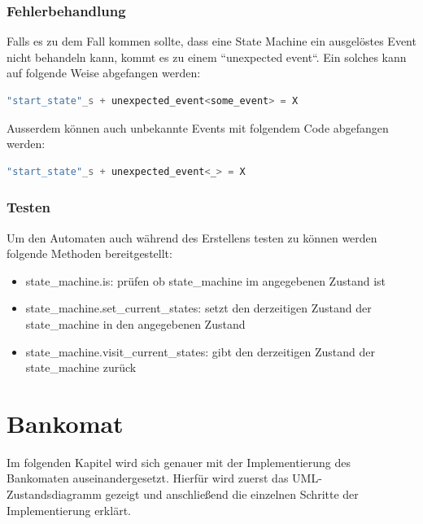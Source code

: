 \documentclass{report}
\begin{document}
\subsection{Fehlerbehandlung}
Falls es zu dem Fall kommen sollte, dass eine State Machine ein ausgelöstes Event nicht behandeln kann, kommt es zu einem ``unexpected event``. Ein solches kann auf folgende Weise abgefangen werden: 
\begin{lstlisting}[language=C++]
"start_state"_s + unexpected_event<some_event> = X
\end{lstlisting}
Ausserdem können auch unbekannte Events mit folgendem Code abgefangen werden:
\begin{lstlisting}[language=C++]
"start_state"_s + unexpected_event<_> = X
\end{lstlisting}
\subsection{Testen}
Um den Automaten auch während des Erstellens testen zu können werden folgende Methoden bereitgestellt:
\begin{itemize}
    \item state\_machine.is: prüfen ob state\_machine im angegebenen Zustand ist
    \item state\_machine.set\_current\_states: setzt den derzeitigen Zustand der state\_machine in den angegebenen Zustand
    \item state\_machine.visit\_current\_states: gibt den derzeitigen Zustand der state\_machine zurück
\end{itemize}



\chapter{Bankomat}
Im folgenden Kapitel wird sich genauer mit der Implementierung des Bankomaten auseinandergesetzt. Hierfür wird zuerst das UML-Zustandsdiagramm gezeigt und anschließend die einzelnen Schritte der Implementierung erklärt.
\end{document}
